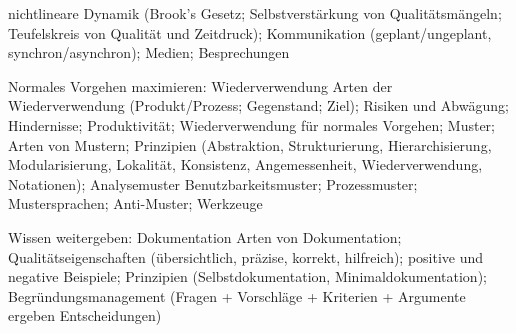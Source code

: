 nichtlineare Dynamik (Brook's Gesetz; Selbstverstärkung von Qualitätsmängeln;
Teufelskreis von Qualität und Zeitdruck);
Kommunikation (geplant/ungeplant, synchron/asynchron); Medien; Besprechungen 

Normales Vorgehen maximieren: Wiederverwendung
Arten der Wiederverwendung (Produkt/Prozess; Gegenstand; Ziel);
Risiken und Abwägung; Hindernisse; Produktivität; Wiederverwendung für normales Vorgehen;
Muster; Arten von Mustern;
Prinzipien (Abstraktion, Strukturierung, Hierarchisierung, Modularisierung, Lokalität, Konsistenz, Angemessenheit, Wiederverwendung, Notationen);
Analysemuster 
Benutzbarkeitsmuster; Prozessmuster; Mustersprachen; Anti-Muster; Werkzeuge 

Wissen weitergeben:
Dokumentation
Arten von Dokumentation; Qualitätseigenschaften (übersichtlich, präzise, korrekt, hilfreich);
positive und negative Beispiele; Prinzipien (Selbstdokumentation, Minimaldokumentation);
Begründungsmanagement (Fragen + Vorschläge + Kriterien + Argumente ergeben Entscheidungen) 
